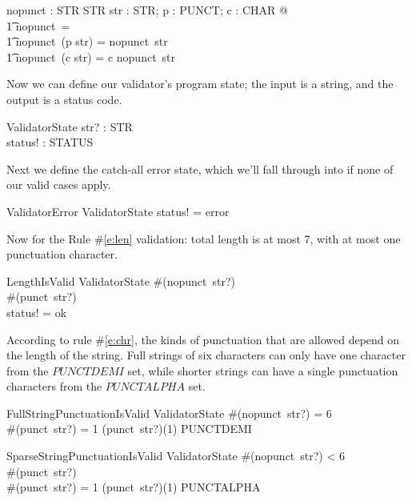 \documentclass[11pt]{article}
\begin{document}
\begin{axdef}
  nopunct : STR \fun STR
  \where
  \forall str : STR; p : PUNCT; c : CHAR  @                    \\
  \t1 nopunct~\langle \rangle = \langle \rangle \land          \\
  \t1 nopunct~(\langle p \rangle \cat str) = nopunct~str \land \\
  \t1 nopunct~(\langle c \rangle \cat str) = \langle c \rangle \cat nopunct~str
\end{axdef}

Now we can define our validator's program state; the input is a string, and the output is a status
code.

\begin{schema}{ValidatorState}
  str? : STR \\
  status! : STATUS
\end{schema}

Next we define the catch-all error state, which we'll fall through into if none of our valid cases
apply.

\begin{schema}{ValidatorError}
  ValidatorState
  \where
  status! = error
\end{schema}

Now for the Rule \#\ref{e:len} validation: total length is at most 7, with at most one punctuation
character.

\begin{schema}{LengthIsValid}
  ValidatorState
  \where
  \#(nopunct~str?)  \\
  \#(punct~str?)    \\
  status! = ok
\end{schema}

According to rule \#\ref{e:chr}, the kinds of punctuation that are allowed depend on the length of
the string.  Full strings of six characters can only have one character from the $PUNCTDEMI$ set,
while shorter strings can have a single punctuation characters from the $PUNCTALPHA$ set.

\begin{schema}{FullStringPunctuationIsValid}
  ValidatorState
  \where
  \#(nopunct~str?) = 6 \\
  \#(punct~str?) = 1 \implies (punct~str?)(1) \in PUNCTDEMI
\end{schema}

\begin{schema}{SparseStringPunctuationIsValid}
  ValidatorState
  \where
  \#(nopunct~str?) < 6  \\
  \#(punct~str?)  \\
  \#(punct~str?) = 1 \implies (punct~str?)(1) \in PUNCTALPHA
\end{schema}
\end{document}
